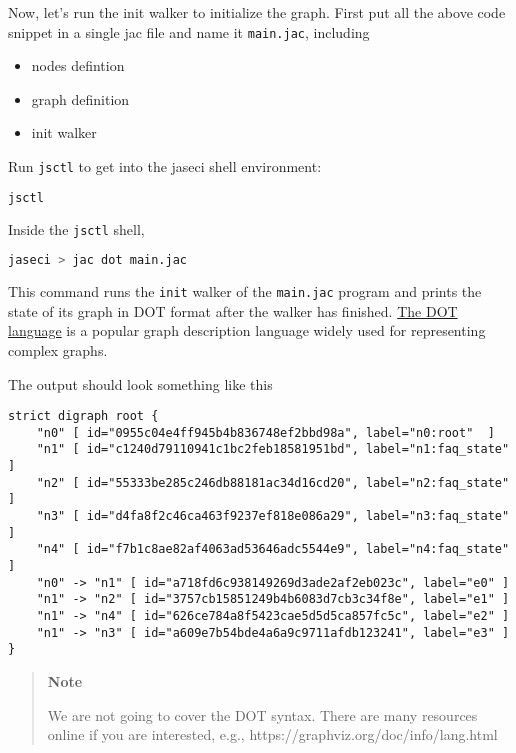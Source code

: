 Now, let's run the init walker to initialize the graph. First put all
the above code snippet in a single jac file and name it
\passthrough{\lstinline!main.jac!}, including

\begin{itemize}
\tightlist
\item
  nodes defintion
\item
  graph definition
\item
  init walker
\end{itemize}

Run \passthrough{\lstinline!jsctl!} to get into the jaseci shell
environment:

\begin{lstlisting}[language=bash]
jsctl
\end{lstlisting}

Inside the \passthrough{\lstinline!jsctl!} shell,

\begin{lstlisting}[language=bash]
jaseci > jac dot main.jac
\end{lstlisting}

This command runs the \passthrough{\lstinline!init!} walker of the
\passthrough{\lstinline!main.jac!} program and prints the state of its
graph in DOT format after the walker has finished.
\href{https://graphviz.org/doc/info/lang.html}{The DOT language} is a
popular graph description language widely used for representing complex
graphs.

The output should look something like this

\begin{lstlisting}
strict digraph root {
    "n0" [ id="0955c04e4ff945b4b836748ef2bbd98a", label="n0:root"  ]
    "n1" [ id="c1240d79110941c1bc2feb18581951bd", label="n1:faq_state"  ]
    "n2" [ id="55333be285c246db88181ac34d16cd20", label="n2:faq_state"  ]
    "n3" [ id="d4fa8f2c46ca463f9237ef818e086a29", label="n3:faq_state"  ]
    "n4" [ id="f7b1c8ae82af4063ad53646adc5544e9", label="n4:faq_state"  ]
    "n0" -> "n1" [ id="a718fd6c938149269d3ade2af2eb023c", label="e0" ]
    "n1" -> "n2" [ id="3757cb15851249b4b6083d7cb3c34f8e", label="e1" ]
    "n1" -> "n4" [ id="626ce784a8f5423cae5d5d5ca857fc5c", label="e2" ]
    "n1" -> "n3" [ id="a609e7b54bde4a6a9c9711afdb123241", label="e3" ]
}
\end{lstlisting}

\begin{quote}
\textbf{Note}

We are not going to cover the DOT syntax. There are many resources
online if you are interested, e.g.,
https://graphviz.org/doc/info/lang.html
\end{quote}

